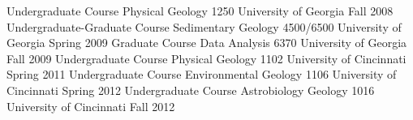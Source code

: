 \begin{cventries}
  \cventry
    {Undergraduate Course}
    {Physical Geology 1250}
    {University of Georgia}
    {Fall 2008}
    {}
  \cventry
    {Undergraduate-Graduate Course}
    {Sedimentary Geology 4500/6500}
    {University of Georgia}
    {Spring 2009}
    {}
  \cventry
    {Graduate Course}
    {Data Analysis 6370}
    {University of Georgia}
    {Fall 2009}
    {}
   \cventry
    {Undergraduate Course}
    {Physical Geology 1102}
    {University of Cincinnati}
    {Spring 2011}
    {}
   \cventry
    {Undergraduate Course}
    {Environmental Geology 1106}
    {University of Cincinnati}
    {Spring 2012}
    {}
   \cventry
    {Undergraduate Course}
    {Astrobiology Geology 1016}
    {University of Cincinnati}
    {Fall 2012}
    {}
\end{cventries}